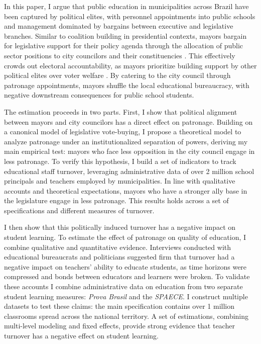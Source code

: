 \documentclass[12pt,a4paper]{article}
\begin{document}
In this paper, I argue that public education in municipalities across Brazil have been captured by political elites, with personnel appointments into public schools and management dominated by bargains between executive and legislative branches. Similar to coalition building in presidential contexts, mayors bargain for legislative support for their policy agenda through the allocation of public sector positions to city councilors and their constituencies \citep{laver_coalitions_1990, power_optimism_2010}. This effectively crowds out electoral accountability, as mayors prioritize building support by other political elites over voter welfare \citep{ferejohn_incumbent_1986}. By catering to the city council through patronage appointments, mayors shuffle the local educational bureaucracy, with negative downstream consequences for public school students.

The estimation proceeds in two parts. First, I show that political alignment between mayors and city councilors has a direct effect on patronage. Building on a canonical model of legislative vote-buying, I propose a theoretical model to analyze patronage under an institutionalized separation of powers, deriving my main empirical test: mayors who face less opposition in the city council engage in less patronage. To verify this hypothesis, I build a set of indicators to track educational staff turnover, leveraging administrative data of over 2 million school principals and teachers employed by municipalities. In line with qualitative accounts and theoretical expectations, mayors who have a stronger ally base in the legislature engage in less patronage. This results holds across a set of specifications and different measures of turnover.

I then show that this politically induced turnover has a negative impact on student learning. To estimate the effect of patronage on quality of education, I combine qualitative and quantitative evidence. Interviews conducted with educational bureaucrats and politicians suggested firm that turnover had a negative impact on teachers' ability to educate students, as time horizons were compressed and bonds between educators and learners were broken. To validate these accounts I combine administrative data on education from two separate student learning measures: \emph{Prova Brasil} and the \emph{SPAECE}. I construct multiple datasets to test these claims: the main specification contains over 1 million classrooms spread across the national territory. A set of estimations, combining multi-level modeling and fixed effects, provide strong evidence that teacher turnover has a negative effect on student learning.
\end{document}
